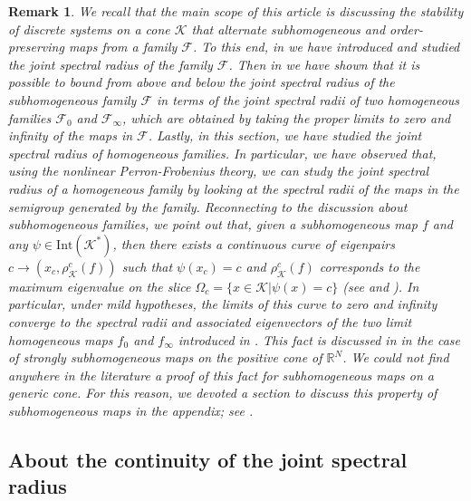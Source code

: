 \documentclass{article}
\newtheorem{remark}[theorem]{Remark}
\newcommand{\R}{\mathbb{R}}
\newcommand{\family}{\mathcal{F}}
\newcommand{\cradius}{\rho_{\cone}}
\newcommand{\cone}{\mathcal{K}}
\newcommand{\interior}{\mathrm{Int}}
\begin{document}
 \begin{remark}
     We recall that the main scope of this article is discussing the stability of discrete systems on a cone $\cone$ that alternate subhomogeneous and order-preserving maps from a family $\family$. To this end, in  we have introduced and studied the joint spectral radius of the family $\family$. Then in  we have shown that it is possible to bound from above and below the joint spectral radius of the subhomogeneous family $\family$ in terms of the joint spectral radii of two homogeneous families $\family_0$ and $\family_{\infty}$, which are obtained by taking the proper limits to zero and infinity of the maps in $\family$. Lastly, in this section, we have studied the joint spectral radius of homogeneous families.  In particular, we have observed that, using the nonlinear Perron-Frobenius theory, we can study the joint spectral radius of a homogeneous family by looking at the spectral radii of the maps in the semigroup generated by the family. 
    Reconnecting to the discussion about subhomogeneous families, we point out that, given a subhomogeneous map $f$ and any $\psi\in\interior(\cone^*)$, then there exists a continuous curve of eigenpairs $c\rightarrow(x_c,\cradius^c(f))$ such that $\psi(x_c)=c$ and $\cradius^c(f)$ corresponds to the maximum eigenvalue on the slice $\Omega_c=\{x\in \cone|\psi(x)=c\}$ (see  and ).
    In particular, under mild hypotheses, the limits of this curve to zero and infinity converge to the spectral radii and associated eigenvectors of the two limit homogeneous maps $f_0$ and $f_{\infty}$ introduced in . This fact is discussed in \cite{cavalcante2019connections, nuzman2007contraction} in the case of strongly subhomogeneous maps on the positive cone of $\R^N$. We could not find anywhere in the literature a proof of this fact for subhomogeneous maps on a generic cone. For this reason, we devoted a section to discuss this property of subhomogeneous maps in the appendix; see .

\end{remark}


\subsection{About the continuity of the joint spectral radius}\label{subsec:continuity_JSR}
\end{document}
